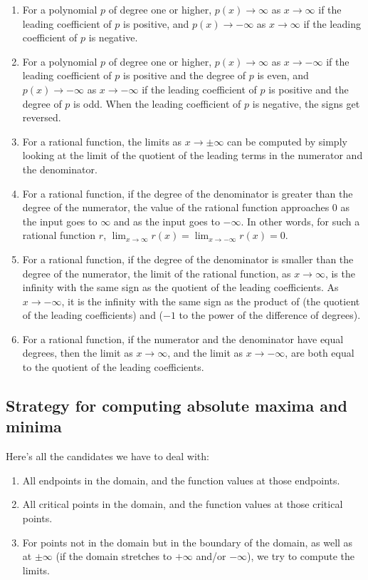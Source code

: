 \documentclass{amsart}
\begin{document}
\begin{enumerate}
\item For a polynomial $p$ of degree one or higher, $p(x) \to \infty$
  as $x \to \infty$ if the leading coefficient of $p$ is positive, and
  $p(x) \to -\infty$ as $x \to \infty$ if the leading coefficient of
  $p$ is negative.
\item For a polynomial $p$ of degree one or higher, $p(x) \to \infty$
  as $x \to -\infty$ if the leading coefficient of $p$ is positive and
  the degree of $p$ is even, and $p(x) \to -\infty$ as $x \to -\infty$
  if the leading coefficient of $p$ is positive and the degree of $p$
  is odd. When the leading coefficient of $p$ is negative, the signs
  get reversed.
\item For a rational function, the limits as $x \to \pm \infty$ can be
  computed by simply looking at the limit of the quotient of the
  leading terms in the numerator and the denominator.
\item For a rational function, if the degree of the denominator is
  greater than the degree of the numerator, the value of the rational
  function approaches $0$ as the input goes to $\infty$ and as the
  input goes to $-\infty$. In other words, for such a rational
  function $r$, $\lim_{x \to \infty} r(x) = \lim_{x \to -\infty} r(x)
  = 0$.
\item For a rational function, if the degree of the denominator is
  smaller than the degree of the numerator, the limit of the rational
  function, as $x \to \infty$, is the infinity with the same sign as
  the quotient of the leading coefficients. As $x \to -\infty$, it is
  the infinity with the same sign as the product of (the quotient of
  the leading coefficients) and ($-1$ to the power of the difference of
  degrees).
\item For a rational function, if the numerator and the denominator
  have equal degrees, then the limit as $x \to \infty$, and the limit
  as $x \to -\infty$, are both equal to the quotient of the leading
  coefficients.
\end{enumerate}

\subsection{Strategy for computing absolute maxima and minima}

Here's all the candidates we have to deal with:

\begin{enumerate}
\item All endpoints in the domain, and the function values at those
  endpoints.
\item All critical points in the domain, and the function values at
  those critical points.
\item For points not in the domain but in the boundary of the domain,
  as well as at $\pm \infty$ (if the domain stretches to $+\infty$
  and/or $-\infty$), we try to compute the limits.
\end{enumerate}
\end{document}
